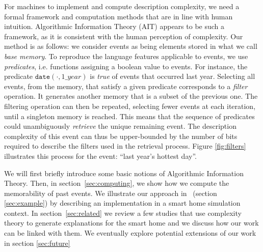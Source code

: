 \documentclass[entropy,article,submit,moreauthors,pdftex]{Definitions/mdpi}
\begin{document}
For machines to implement and compute description complexity, we need a formal framework and computation methods that are in line with human intuition.  Algorithmic Information Theory (AIT) appears to be such a framework, as it is consistent with the human perception of complexity\cite{li_introduction_2008,dessalles2011coincidences,delahaye_numerical_2012}. Our method is as follows: we
consider events as being elements stored in what we call \emph{base memory}. To
reproduce the language features applicable to events, we use \emph
{predicates}, i.e. functions assigning a boolean value to events. For instance, the predicate $\mathtt{date}
    (\cdot, 1\_year)$ is \emph{true} of events that occurred last year. Selecting
all events, from the memory, that satisfy a given predicate corresponds to
a \emph{filter} operation. It generates another memory that is a subset of the previous one.
The filtering operation can then be repeated, selecting
fewer events at each iteration, until a singleton memory is reached. This means that the sequence
of predicates could unambiguously \emph{retrieve} the unique remaining event.
The description complexity of this event can thus be upper-bounded by the
number of bits required to describe the filters used in the retrieval
process. Figure \ref{fig:filters} illustrates this process for the event: ``last year's hottest day''.




We will first briefly introduce
some basic notions of Algorithmic Information Theory. Then, in
section~\ref{sec:computing}, we show how we compute the
memorability of past events. We illustrate our approach in~
(section \ref{sec:example}) by describing an implementation
in a smart home simulation context. In section~\ref{sec:related} we review
a few studies that use complexity theory to generate explanations for the smart home
and we discuss how our work can be linked with them. We eventually explore potential
extensions of our work in section \ref{sec:future}
\end{document}

